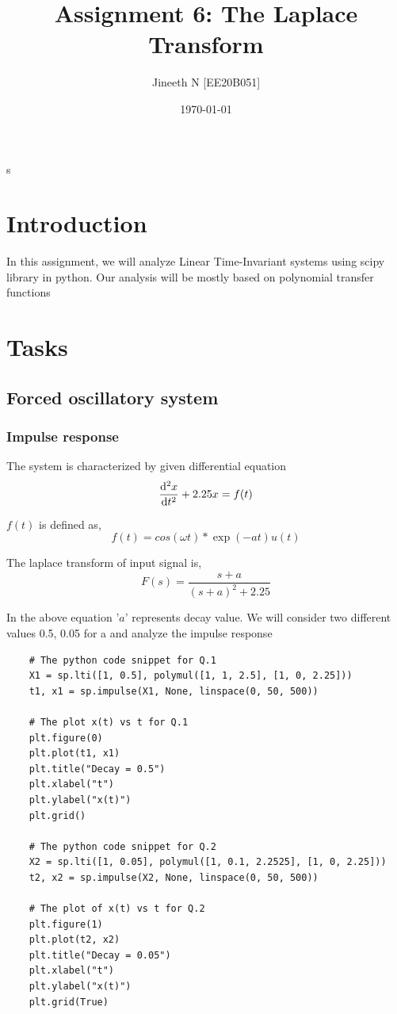 s\documentclass{article}
\title{Assignment 6: The Laplace Transform }
\author{Jineeth N [EE20B051]}
\date{\today}
\begin{document}
\maketitle %

\section{Introduction}
 In this assignment, we will analyze Linear Time-Invariant systems using scipy library in python. Our analysis will be mostly based on polynomial transfer functions

\section{Tasks}
\subsection{Forced oscillatory system}

\subsubsection{Impulse response}
    The system is characterized by given differential equation
    \begin{equation}
    \dv[2]{x}{t} + 2.25x = f(t) 
        \end{equation}
        
$f(t)$ is defined as,
    \begin{equation}
    f(t) = cos{(\omega t)}*\exp(-at)u(t)
        \end{equation}

    The laplace transform of input signal is,
    \begin{equation}
    F(s) = \frac{s+a}{(s+a)^2+2.25 }
        \end{equation}
        
    In the above equation '$a$' represents decay value. We will consider two different values 0.5, 0.05 for a and analyze the impulse response

\begin{verbatim}
    # The python code snippet for Q.1
    X1 = sp.lti([1, 0.5], polymul([1, 1, 2.5], [1, 0, 2.25]))
    t1, x1 = sp.impulse(X1, None, linspace(0, 50, 500))
    
    # The plot x(t) vs t for Q.1
    plt.figure(0)
    plt.plot(t1, x1)
    plt.title("Decay = 0.5")
    plt.xlabel("t")
    plt.ylabel("x(t)")
    plt.grid()
    
    # The python code snippet for Q.2
    X2 = sp.lti([1, 0.05], polymul([1, 0.1, 2.2525], [1, 0, 2.25]))
    t2, x2 = sp.impulse(X2, None, linspace(0, 50, 500))
    
    # The plot of x(t) vs t for Q.2
    plt.figure(1)
    plt.plot(t2, x2)
    plt.title("Decay = 0.05")
    plt.xlabel("t")
    plt.ylabel("x(t)")
    plt.grid(True)
\end{verbatim}
\end{document}
